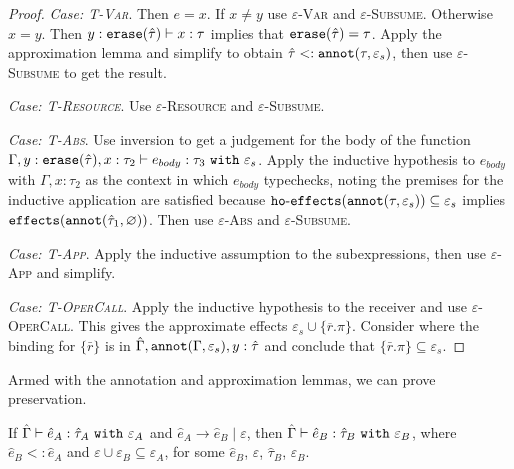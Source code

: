 {\begin{proof}
\textit{Case: \textsc{T-Var}}. Then $e = x$. If $x \neq y$ use
\textsc{$\varepsilon$-Var} and \textsc{$\varepsilon$-Subsume}. Otherwise $x = y$.
Then $y: \mathtt{erase}(\hat \tau) \vdash x: \tau$ implies that $\mathtt{erase}(\hat \tau) = \tau$.
Apply the approximation lemma and simplify to obtain $\hat \tau <:
\mathtt{annot}(\tau, \varepsilon_s)$, then use \textsc{$\varepsilon$-Subsume} to get the
result.

\textit{Case: \textsc{T-Resource}}. Use \textsc{$\varepsilon$-Resource} and
\textsc{$\varepsilon$-Subsume}.

\textit{Case: \textsc{T-Abs}}. Use inversion to get a judgement for the body of the
function $\Gamma, y: \mathtt{erase}(\hat \tau), x: \tau_2 \vdash e_{body}: \tau_3
~\mathtt{with}~ \varepsilon_s$. Apply the inductive hypothesis to $e_{body}$ with
$\Gamma, x: \tau_2$ as the context in which $e_{body}$ typechecks, noting the
premises for the inductive application are satisfied because
$\mathtt{ho \hbox{-} effects}(\mathtt{annot}(\tau, \varepsilon_s)) \subseteq \varepsilon_s$ implies
$\mathtt{effects}(\mathtt{annot}(\hat \tau_1, \varnothing))$. Then use \textsc{$\varepsilon$-Abs} and
\textsc{$\varepsilon$-Subsume}.

\textit{Case: \textsc{T-App}}. Apply the inductive assumption to the subexpressions,
then use \textsc{$\varepsilon$-App} and simplify.

\textit{Case: \textsc{T-OperCall}}. Apply the inductive hypothesis to the receiver and
use \textsc{$\varepsilon$-OperCall}. This gives the approximate effects $\varepsilon_s
\cup \{ \overline{r}.\pi \}$. Consider where the binding for $\{ \bar r \}$ is in
$\hat \Gamma, \mathtt{annot}(\Gamma, \varepsilon_s), y: \hat \tau$ and conclude that
$\{ \bar r.\pi \} \subseteq \varepsilon_s$.
\end{proof}

Armed with the annotation and approximation lemmas, we can prove preservation.

\begin{theorem}
If $\hat \Gamma \vdash \hat e_A: \hat \tau_A~\mathtt{with}~ \varepsilon_A$ and
$\hat e_A \longrightarrow \hat e_B \mid \varepsilon$, then $\hat \Gamma \vdash
\hat e_B: \hat \tau_B~\mathtt{with}~ \varepsilon_B$, where $\hat e_B <: \hat e_A$
and $\varepsilon \cup \varepsilon_B \subseteq \varepsilon_A$, for some $\hat e_B$,
$\varepsilon$, $\hat \tau_B$, $\varepsilon_B$.
\end{theorem}

}

